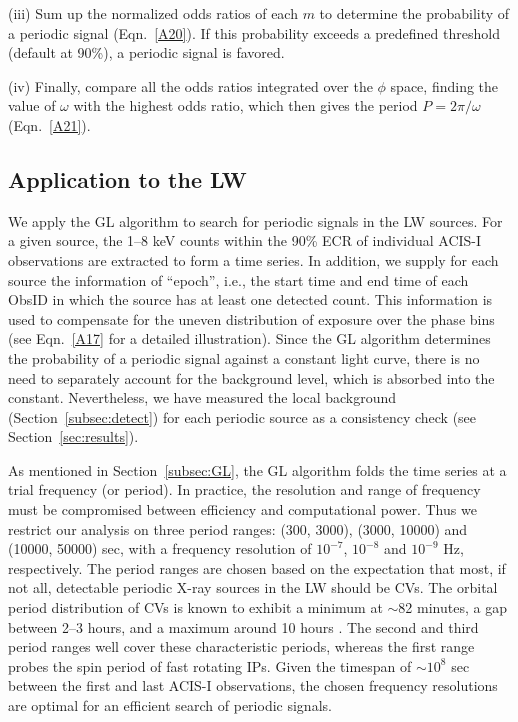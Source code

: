 \documentclass[fleqn,usenatbib]{mnras}
\begin{document}
(iii) Sum up the normalized odds ratios of each $m$ to determine the probability of a periodic signal (Eqn.~\ref{A20}).
If this probability exceeds a predefined threshold (default at 90\%), a periodic signal is favored. 

(iv) Finally, compare all the odds ratios integrated over the $\phi$ space, finding the value of $\omega$ with the highest odds ratio, which then gives the period $P=2{\pi}/\omega$ (Eqn.~\ref{A21}).

\subsection{Application to the LW}\label{subsec:appli}
We apply the GL algorithm to search for periodic signals in the LW sources. 
For a given source, the 1--8 keV counts within the 90\% ECR of individual ACIS-I observations are extracted to form a time series.  
In addition, we supply for each source the information of ``epoch'', i.e., the start time and end time of each ObsID in which the source has at least one detected count. This information is used to compensate for the uneven distribution of exposure over the phase bins (see Eqn.~\ref{A17} for a detailed illustration). 
Since the GL algorithm determines the probability of a periodic signal against a constant light curve, there is no need to separately account for the background level, which is absorbed into the constant. 
Nevertheless, we have measured the local background (Section~\ref{subsec:detect}) for each periodic source as a consistency check (see Section~\ref{sec:results}). 

As mentioned in Section~\ref{subsec:GL}, the GL algorithm folds the time series at a trial frequency (or period). 
In practice, the resolution and range of frequency must be compromised between efficiency and computational power. %
Thus we restrict our analysis on three period ranges: (300, 3000), (3000, 10000) and (10000, 50000) sec, with a frequency resolution of $10^{-7}$, $10^{-8}$ and $10^{-9}$ Hz, respectively. 
The period ranges are chosen based on the expectation that most, if not all, detectable periodic X-ray sources in the LW should be CVs. 
The orbital period distribution of CVs is known to exhibit a minimum at $\sim$82 minutes, a gap between 2--3 hours, and a maximum around 10 hours 
\citep{2011ApJS..194...28K}.
The second and third period ranges well cover these characteristic periods, whereas the first range probes the spin period of fast rotating IPs.
Given the timespan of $\sim10^8$ sec between the first and last ACIS-I observations, the chosen frequency resolutions are optimal for an efficient search of periodic signals.  
\end{document}
